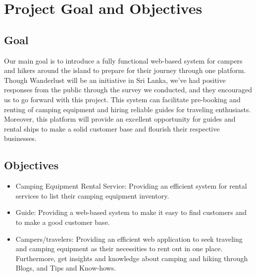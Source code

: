 \section{Project Goal and Objectives}
\subsection{Goal}
Our main goal is to introduce a fully functional web-based system for campers and hikers around the island to prepare for their journey through one platform. Though Wanderlust will be an initiative in Sri Lanka, we’ve had positive responses from the public through the survey we conducted, and they encouraged us to go forward with this project. This system can facilitate pre-booking and renting of camping equipment and hiring reliable guides for traveling enthusiasts. Moreover, this platform will provide an excellent opportunity for guides and rental ships to make a solid customer base and flourish their respective businesses.



\subsection{Objectives}
\begin{itemize}
	\item Camping Equipment Rental Service: Providing an efficient system for rental services to list their camping equipment inventory.

	      
	\item Guide: Providing a web-based system to make it easy to find customers and to make a good customer base.
	\item Campers/travelers: Providing an efficient web application to seek traveling and camping equipment as their necessities to rent out in one place. Furthermore, get insights and knowledge about camping and hiking through Blogs, and Tips and Know-hows.

	
\end{itemize}
